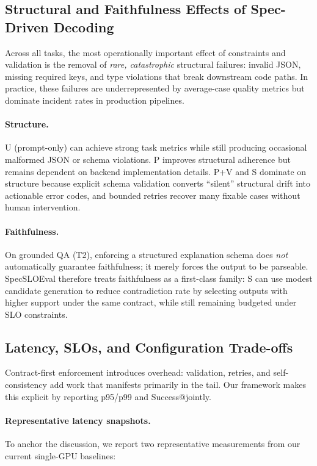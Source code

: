 \subsection{Structural and Faithfulness Effects of Spec-Driven Decoding}
\label{sec:results-structure-faith}

Across all tasks, the most operationally important effect of constraints and validation is the removal of \emph{rare, catastrophic} structural failures:
invalid JSON, missing required keys, and type violations that break downstream code paths.
In practice, these failures are underrepresented by average-case quality metrics but dominate incident rates in production pipelines.

\paragraph{Structure.}
U (prompt-only) can achieve strong task metrics while still producing occasional malformed JSON or schema violations.
P improves structural adherence but remains dependent on backend implementation details.
P+V and S dominate on structure because explicit schema validation converts “silent” structural drift into actionable error codes, and bounded retries recover many fixable cases without human intervention.

\paragraph{Faithfulness.}
On grounded QA (T2), enforcing a structured explanation schema does \emph{not} automatically guarantee faithfulness; it merely forces the output to be parseable.
SpecSLOEval therefore treats faithfulness as a first-class family: S can use modest candidate generation to reduce contradiction rate by selecting outputs with higher support under the same contract, while still remaining budgeted under SLO constraints.

\subsection{Latency, SLOs, and Configuration Trade-offs}
\label{sec:results-slo}

Contract-first enforcement introduces overhead: validation, retries, and self-consistency add work that manifests primarily in the tail.
Our framework makes this explicit by reporting p95/p99 and Success@\slo jointly.

\paragraph{Representative latency snapshots.}
To anchor the discussion, we report two representative measurements from our current single-GPU baselines:

